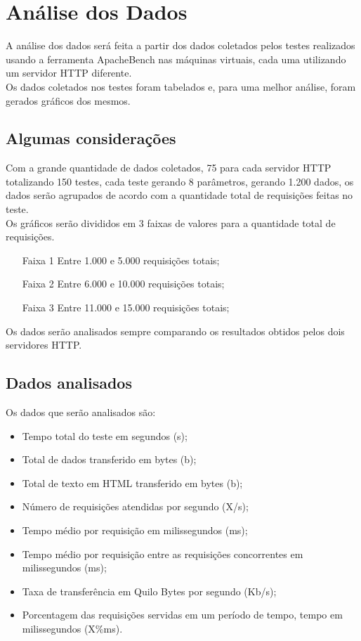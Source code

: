 \chapter{Análise dos Dados}\label{analise-dos-dados}

A análise dos dados será feita a partir dos dados coletados pelos testes realizados usando a ferramenta ApacheBench nas máquinas virtuais, cada uma utilizando um servidor HTTP diferente.\\
Os dados coletados nos testes foram tabelados e, para uma melhor análise, foram gerados gráficos dos mesmos.

\section{Algumas considerações}
Com a grande quantidade de dados coletados, 75 para cada servidor HTTP totalizando 150 testes, cada teste gerando 8 parâmetros, gerando 1.200 dados, os dados serão agrupados de acordo com a quantidade total de requisições feitas no teste. \\
Os gráficos serão divididos em 3 faixas de valores para a quantidade total de requisições.
\begin{itemize}
	\item[Faixa 1] Entre 1.000 e 5.000 requisições totais;
	\item[Faixa 2] Entre 6.000 e 10.000 requisições totais;
	\item[Faixa 3] Entre 11.000 e 15.000 requisições totais;
\end{itemize}
Os dados serão analisados sempre comparando os resultados obtidos pelos dois servidores HTTP.\\

\section{Dados analisados}
Os dados que serão analisados são:

\begin{itemize}
	\item Tempo total do teste em segundos (s);
	\item Total de dados transferido em bytes (b);
	\item Total de texto em HTML transferido em bytes (b);
	\item Número de requisições atendidas por segundo (X/s);
	\item Tempo médio por requisição em milissegundos (ms);
	\item Tempo médio por requisição entre as requisições concorrentes em milissegundos (ms);
	\item Taxa de transferência em Quilo Bytes por segundo (Kb/s);
	\item Porcentagem das requisições servidas em um período de tempo, tempo em milissegundos (X\%ms).
\end{itemize}

